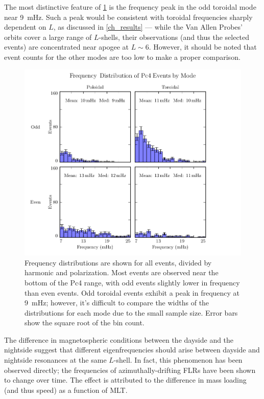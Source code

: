 The most distinctive feature of \cref{fig_f}
is the frequency peak in the odd toroidal mode near \SI{9}{\mHz}. 
Such a peak would be consistent with toroidal frequencies sharply dependent on
$L$, as discussed in \cref{ch_results} --- while the Van Allen Probes' orbits
cover a large range of $L$-shells, their observations (and thus the selected
events) are concentrated near apogee at $L \sim 6$. However, it should be noted
that event counts for the other modes are too low to make a proper comparison. 

\begin{figure}[!htb]
  \centering
  \includegraphics[width=\textwidth]{figures/f.pdf}
  \caption[Frequency Distribution of Pc4 Events by Mode]{
    Frequency distributions are shown for all events, divided by harmonic and
    polarization. Most events are observed near the bottom of the Pc4 range,
    with odd events slightly lower in frequency than even events. Odd toroidal
    events exhibit a peak in frequency at \about\SI{9}{\mHz}; however, it's
    difficult to compare the widths of the distributions for each mode due to
    the small sample size. 
    Error bars show the square root of the bin count. 
  }
  \label{fig_f}
\end{figure}

The difference in magnetospheric conditions between the dayside and the
nightside suggest that different eigenfrequencies should arise between dayside
and nightside resonances at the same $L$-shell. In fact, this phenomenon has
been observed directly; the frequencies of azimuthally-drifting FLRs have been
shown to change over time\cite{motoba_2015}. The effect is attributed to the
difference in mass loading (and thus \Alfven speed) as a function of MLT. 

